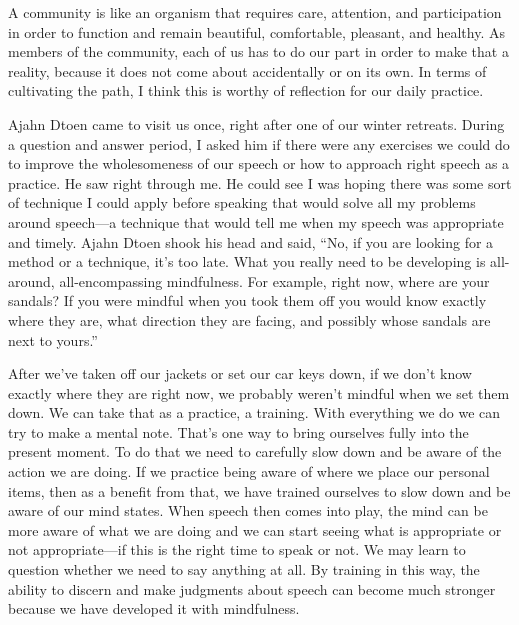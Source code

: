 A community is like an organism that requires care, attention, and 
participation in order to function and remain beautiful, comfortable, 
pleasant, and healthy. As members of the community, each of us has to 
do our part in order to make that a reality, because it does not come 
about accidentally or on its own. In terms of cultivating the path, I 
think this is worthy of reflection for our daily practice.


Ajahn Dtoen came to visit us once, right after one of our winter 
retreats. During a question and answer period, I asked him if there 
were any exercises we could do to improve the wholesomeness of our 
speech or how to approach right speech as a practice. He saw right 
through me. He could see I was hoping there was some sort of technique 
I could apply before speaking that would solve all my problems around 
speech---a technique that would tell me when my speech was appropriate 
and timely. Ajahn Dtoen shook his head and said, ``No, if you are 
looking for a method or a technique, it's too late. What you really 
need to be developing is all-around, all-encompassing mindfulness. For 
example, right now, where are your sandals? If you were mindful when 
you took them off you would know exactly where they are, what direction 
they are facing, and possibly whose sandals are next to yours.''

After we've taken off our jackets or set our car keys down, if we don't 
know exactly where they are right now, we probably weren't mindful when 
we set them down. We can take that as a practice, a training. With 
everything we do we can try to make a mental note. That's one way to 
bring ourselves fully into the present moment. To do that we need to 
carefully slow down and be aware of the action we are doing. If we 
practice being aware of where we place our personal items, then as a 
benefit from that, we have trained ourselves to slow down and be aware 
of our mind states. When speech then comes into play, the mind can be 
more aware of what we are doing and we can start seeing what is 
appropriate or not appropriate---if this is the right time to speak or 
not. We may learn to question whether we need to say anything at all. 
By training in this way, the ability to discern and make judgments 
about speech can become much stronger because we have developed it with 
mindfulness.


